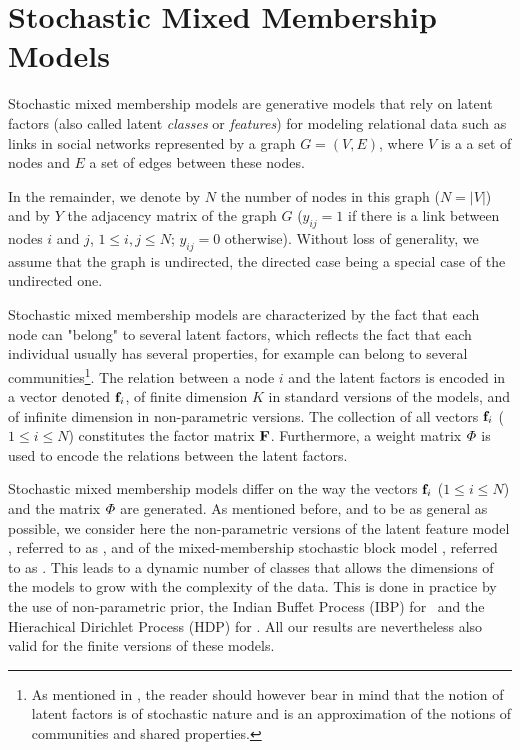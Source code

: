 \section{Stochastic Mixed Membership Models}
\label{sec:background}

Stochastic mixed membership models are generative models that rely on latent factors (also called latent \textit{classes} or \textit{features}) for modeling relational data such as links in social networks represented by a graph $G=(V,E)$, where $V$ is a a set of nodes and $E$ a set of edges between these nodes.

In the remainder, we denote by $N$ the number of nodes in this graph ($N = |V|$) and by $Y$ the adjacency matrix of the graph $G$ ($y_{ij}=1$ if there is a link between nodes $i$ and $j$, $1 \le i,j \le N$; $y_{ij} = 0$ otherwise). Without loss of generality, we assume that the graph is undirected, the directed case being a special case of the undirected one.

Stochastic mixed membership models are characterized by the fact that each node can "belong" to several latent factors, which reflects the fact that each individual usually has several properties, for example can belong to several communities\footnote{As mentioned in \cite{goldenberg2010survey}, the reader should however bear in mind that the notion of latent factors is of stochastic nature and is an approximation of the notions of communities and shared properties.}. The relation between a node $i$ and the latent factors is encoded in a vector denoted $\mathbf{f}_{i}$, of finite dimension $K$ in standard versions of the models, and of infinite dimension in  non-parametric versions. The collection of all vectors $\mathbf{f}_{i}$ ($1 \le i \le N$) constitutes the factor matrix $\mathbf{F}$. Furthermore, a weight matrix $\mat{\Phi}$ is used to encode the relations between the latent factors.

Stochastic mixed membership models differ on the way the vectors $\mathbf{f}_{i}$ ($1 \le i \le N$) and the matrix $\mat{\Phi}$ are generated. As mentioned before, and to be as general as possible, we consider here the non-parametric versions of the latent feature model \cite{ILFRM}, referred to as \ifm, and of the mixed-membership stochastic block model \cite{iMMSB,fan2015dynamic}, referred to as \imb. This leads to a dynamic number of classes that allows the dimensions of the models to grow with the complexity of the data. This is done in practice by the use of non-parametric prior,  the Indian Buffet Process (IBP) for \ifm\ and the Hierachical Dirichlet Process (HDP)  for \imb. All our results are nevertheless also valid for the finite versions of these models.

